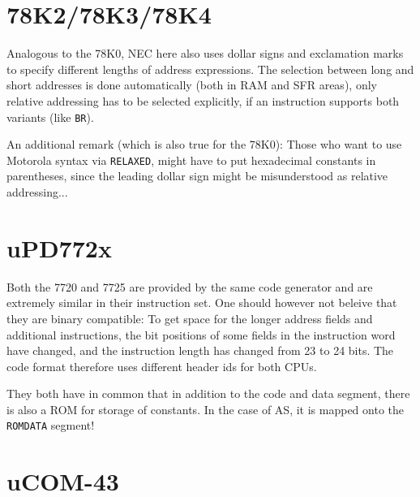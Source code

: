 \documentclass[12pt,twoside]{report}
\newcommand{\tty}[1]{{\tt #1}}
\newcommand{\asname}{{AS}}
\begin{document}
\section{78K2/78K3/78K4}
\label{78K234Spec}

Analogous to the 78K0, NEC here also uses dollar signs and exclamation
marks to specify different lengths of address expressions.  The selection
between long and short addresses is done automatically (both in RAM and
SFR areas), only relative addressing has to be selected explicitly, if an
instruction supports both variants (like {\tt BR}).

An additional remark (which is also true for the 78K0): Those who want to
use Motorola syntax via {\tt RELAXED}, might have to put hexadecimal
constants in parentheses, since the leading dollar sign might be
misunderstood as relative addressing...


\section{uPD772x}

Both the 7720 and 7725 are provided by the same code generator and are
extremely similar in their instruction set.  One should however not
beleive that they are binary compatible: To get space for the longer
address fields and additional instructions, the bit positions of some
fields in the instruction word have changed, and the instruction length
has changed from 23 to 24 bits.  The code format therefore uses different
header ids for both CPUs.

They both have in common that in addition to the code and data segment,
there is also a ROM for storage of constants.  In the case of \asname{}, it is
mapped onto the \tty{ROMDATA} segment!


\section{uCOM-43}
\end{document}
